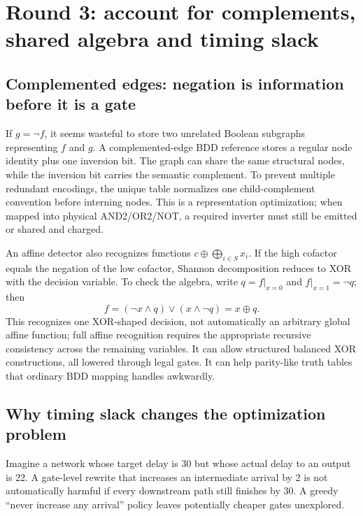 \documentclass[a4paper,10pt]{article}
\theoremstyle{definition}
\theoremstyle{remark}
\newcounter{problem}
\begin{document}
\section{Round 3: account for complements, shared algebra and timing slack}
\subsection{Complemented edges: negation is information before it is a gate}
If $g=\neg f$, it seems wasteful to store two unrelated Boolean subgraphs representing $f$ and $g$. A complemented-edge BDD reference stores a regular node identity plus one inversion bit. The graph can share the same structural nodes, while the inversion bit carries the semantic complement. To prevent multiple redundant encodings, the unique table normalizes one child-complement convention before interning nodes. This is a representation optimization; when mapped into physical AND2/OR2/NOT, a required inverter must still be emitted or shared and charged.

An affine detector also recognizes functions $c\oplus\bigoplus_{i\in S}x_i$. If the high cofactor equals the negation of the low cofactor, Shannon decomposition reduces to XOR with the decision variable. To check the algebra, write $q=f|_{x=0}$ and $f|_{x=1}=\neg q$; then
\[
 f=(\neg x\land q)\lor(x\land\neg q)=x\oplus q.
\]
This recognizes one XOR-shaped decision, not automatically an arbitrary global affine function; full affine recognition requires the appropriate recursive consistency across the remaining variables. It can allow structured balanced XOR constructions, all lowered through legal gates. It can help parity-like truth tables that ordinary BDD mapping handles awkwardly.

\subsection{Why timing slack changes the optimization problem}
Imagine a network whose target delay is 30 but whose actual delay to an output is 22. A gate-level rewrite that increases an intermediate arrival by 2 is not automatically harmful if every downstream path still finishes by 30. A greedy ``never increase any arrival'' policy leaves potentially cheaper gates unexplored.
\end{document}
